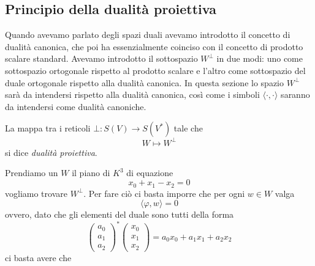 \documentclass[11pt]{scrartcl}
\begin{document}
   	 \subsection{Principio della dualità proiettiva}
   	 Quando avevamo parlato degli spazi duali avevamo introdotto il concetto di dualità canonica, che poi ha essenzialmente coinciso con il concetto di prodotto scalare standard. Avevamo introdotto il sottospazio $W^\perp$ in due modi: uno come sottospazio ortogonale rispetto al prodotto scalare e l'altro come sottospazio del duale ortogonale rispetto alla dualità canonica. In questa sezione lo spazio $W^\perp$ sarà da intendersi rispetto alla dualità canonica, così come i simboli $\langle \cdot ,\cdot \rangle$ saranno da intendersi come dualità canoniche. 
   	 \begin{definition}
   	 	La mappa tra i reticoli $\bot:S(V)\to S(V^*)$ tale che
   	 	$$W\mapsto W^\perp$$
   	 	si dice \textit{dualità proiettiva}.
   	 \end{definition}
   	 \begin{example}
   	 	Prendiamo un $W$ il piano di $K^3$ di equazione 
   	 	$$x_0+x_1-x_2=0$$
   	 	vogliamo trovare $W^\perp$. Per fare ciò ci basta imporre che per ogni $w\in W$ valga
   	 	$$\langle \varphi,w\rangle=0$$
   	 	ovvero, dato che gli elementi del duale sono tutti della forma
   	 	$$\begin{pmatrix}
   	 		a_0 \\
   	 		a_1 \\
   	 		a_2
   	 	\end{pmatrix}^*\begin{pmatrix}
   	 	x_0 \\
   	 	x_1 \\
   	 	x_2
   	 	\end{pmatrix}=a_0x_0+a_1x_1+a_2x_2$$
   	 	ci basta avere che 
   	 	
   	 \end{example}
\end{document}
